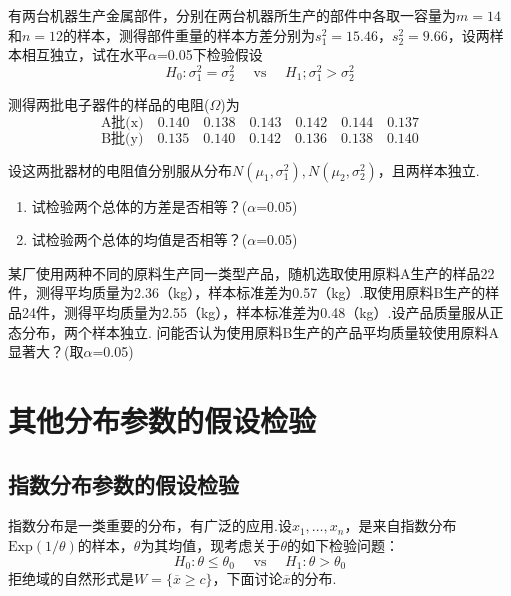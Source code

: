 \begin{xiti}
	
	\item 有两台机器生产金属部件，分别在两台机器所生产的部件中各取一容量为$m=14$和$n=12$的样本，测得部件重量的样本方差分别为$s_{1}^{2}=15.46，s_{2}^{2}=9.66$，设两样本相互独立，试在水平$\alpha$=0.05下检验假设
	\[H _ { 0 } : \sigma _ { 1 } ^ { 2 } = \sigma _ { 2 } ^ { 2 } \quad \text { vs } \quad H _ { 1 } ; \sigma _ { 1 } ^ { 2 } > \sigma _ { 2 } ^ { 2 }\]
	
	
	\item 测得两批电子器件的样品的电阻($ \Omega$)为
	\[\text{A批(x)}\quad0.140 \quad 0.138 \quad 0.143 \quad 0.142 \quad 0.144 \quad 0.137\]
	\[\text{B批(y)}\quad0.135 \quad 0.140 \quad 0.142 \quad 0.136 \quad 0.138 \quad 0.140\]

	设这两批器材的电阻值分别服从分布$N \left( \mu _ { 1 } , \sigma _ { 1 } ^ { 2 } \right) , N \left( \mu _ { 2 } , \sigma _ { 2 } ^ { 2 } \right)$，且两样本独立.
	\begin{enumerate}
		\item 试检验两个总体的方差是否相等？($\alpha$=0.05)
		\item 试检验两个总体的均值是否相等？($\alpha$=0.05)
	\end{enumerate}
	
	\item 某厂使用两种不同的原料生产同一类型产品，随机选取使用原料A生产的样品22件，测得平均质量为2.36（kg），样本标准差为0.57（kg）.取使用原料B生产的样品24件，测得平均质量为2.55（kg），样本标准差为0.48（kg）.设产品质量服从正态分布，两个样本独立.
	问能否认为使用原料B生产的产品平均质量较使用原料A显著大？(取$\alpha$=0.05)
\end{xiti}


\section{其他分布参数的假设检验\label{sec:7.3}}
\subsection{指数分布参数的假设检验\label{sec:7.3.1}}
指数分布是一类重要的分布，有广泛的应用.设$x_{1},\dotsc,x_{n}$，是来自指数分布$\mathrm{ Exp}(1/\theta)$的样本，$\theta$为其均值，现考虑关于$\theta$的如下检验问题：
\begin{equation}\label{eq7.3.1}
H _ { 0 } : \theta \leq \theta _ { 0 } \quad \text { vs } \quad H _ { 1 } : \theta > \theta _ { 0 }
\end{equation}
拒绝域的自然形式是$W = \{ \overline { x } \geq c \}$，下面讨论$\overline{ x }$的分布.

